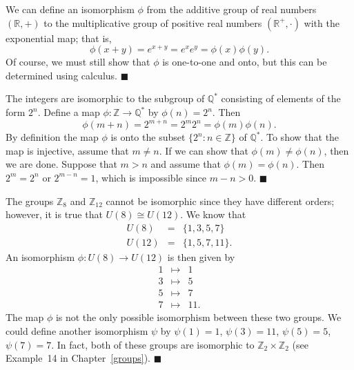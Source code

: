 We can define an isomorphism $\phi$ from the additive group of real numbers $( {\mathbb R}, + )$ to the multiplicative group of positive real numbers  $( {\mathbb R^+}, \cdot )$  with the exponential map; that is,
$$
\phi( x + y) = e^{x + y} = e^x e^y = \phi( x ) \phi( y).
$$
Of course, we must still show that $\phi$ is one-to-one and onto, but this can be determined using calculus. 
\hspace{\fill} $\blacksquare$

\medskip

The integers are isomorphic to the subgroup of ${\mathbb Q}^\ast$ consisting of elements of the form $2^n$.  Define a map $\phi: {\mathbb Z} \rightarrow {\mathbb Q}^\ast$ by $\phi( n ) = 2^n$. Then
$$
\phi( m + n ) = 2^{m + n} = 2^m 2^n = \phi( m ) \phi( n ).
$$
By definition the map $\phi$ is onto the subset $\{2^n :n \in {\mathbb Z} \}$ of  ${\mathbb Q}^\ast$.  To show that the map is injective, assume that $m \neq n$.  If we can show that $\phi(m) \neq \phi(n)$, then we are done.  Suppose that $m>n$ and assume that $\phi(m) = \phi(n)$.  Then $2^m = 2^n$ or $2^{m-n} = 1$, which is impossible since $m-n>0$. 
\hspace{\fill} $\blacksquare$

\medskip

The groups ${\mathbb Z}_8$ and ${\mathbb Z}_{12}$  cannot be isomorphic since they have different orders; however, it is true that $U(8) \cong U(12)$.  We know that
\begin{eqnarray*}
U(8) & = & \{1, 3, 5, 7 \} \\
U(12) & = & \{1, 5, 7, 11 \}.
\end{eqnarray*}
An isomorphism $\phi : U(8) \rightarrow U(12)$ is then given by
\begin{eqnarray*}
1 & \mapsto & 1 \\
3 & \mapsto & 5 \\
5 & \mapsto & 7 \\
7 & \mapsto & 11.
\end{eqnarray*}
The map $\phi$ is not the only possible isomorphism between these two groups.  We could define another isomorphism $\psi$ by $\psi(1) = 1$, $\psi(3) = 11$, $\psi(5) = 5$, $\psi(7) = 7$. In fact, both of these groups are isomorphic to ${\mathbb Z}_2 \times {\mathbb Z}_2$ (see Example~14 in Chapter~\ref{groups}). 
\hspace{\fill} $\blacksquare$

\medskip

